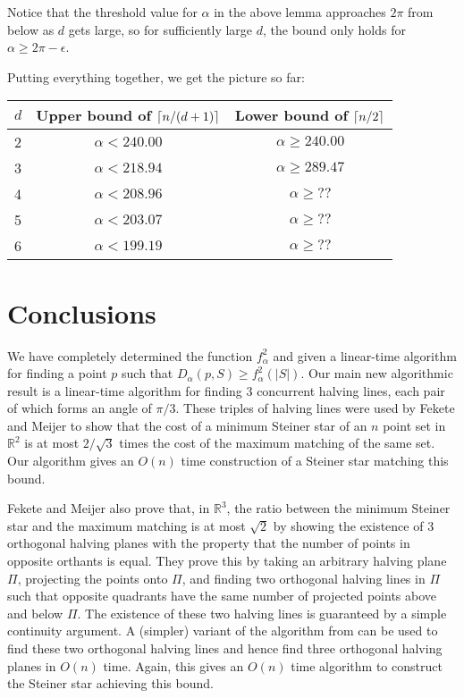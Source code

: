 \documentclass{dmtcs}
\newcommand{\R}{\mathbb{R}}
\begin{document}
{Notice that the threshold value for $\alpha$ in the above lemma
approaches $2\pi$ from below as $d$ gets large, so for sufficiently
large $d$, the bound only holds for $\alpha \ge 2\pi -\epsilon$.

Putting everything together, we get the picture so far:

\begin{tabular}{l|cc}
$d$ & Upper bound of $\left\lceil n/(d+1) \right\rceil$ & Lower bound of $\left\lceil n/2 \right\rceil$ \\
\hline
2 & $\alpha < 240.00$ & $\alpha \ge 240.00$ \\
3 & $\alpha < 218.94$ & $\alpha \ge 289.47$ \\
4 & $\alpha < 208.96$ & $\alpha \ge ??$ \\
5 & $\alpha < 203.07$ & $\alpha \ge ??$ \\
6 & $\alpha < 199.19$ & $\alpha \ge ??$ \\
\end{tabular}
}





\section{Conclusions}

We have completely determined the function $f^2_\alpha$ and given a
linear-time algorithm for finding a point $p$ such that
$D_\alpha(p,S)\ge f^2_\alpha(|S|)$.  
Our main new algorithmic result is a linear-time algorithm for finding
3 concurrent halving lines, each pair of which forms an angle of
$\pi/3$.  These triples of halving lines were used by Fekete and
Meijer \cite{fm00}
to show that the cost of a minimum Steiner star of an $n$ point
set in $\R^2$ is at most $2/\sqrt{3}$ times the cost of the
maximum matching of the same set.  Our algorithm gives an $O(n)$ time
construction of a Steiner star matching this bound.  

Fekete and Meijer also prove that, in $\R^3$, the ratio
between the minimum Steiner star and the maximum matching is at most
$\sqrt{2}$ by showing the existence of 3 orthogonal halving planes
with the property that the number of points in opposite orthants is
equal.  They prove this by taking an arbitrary halving plane $\Pi$,
projecting the points onto $\Pi$, and finding two orthogonal halving
lines in $\Pi$ such that opposite quadrants have the same number of
projected points above and below $\Pi$. The existence of these two
halving lines is guaranteed by a simple continuity argument.   A
(simpler) variant of the algorithm from  can be
used to find these two orthogonal halving lines and hence find three
orthogonal halving planes in $O(n)$ time.  Again, this gives an $O(n)$
time algorithm to construct the Steiner star achieving this bound.
\end{document}
